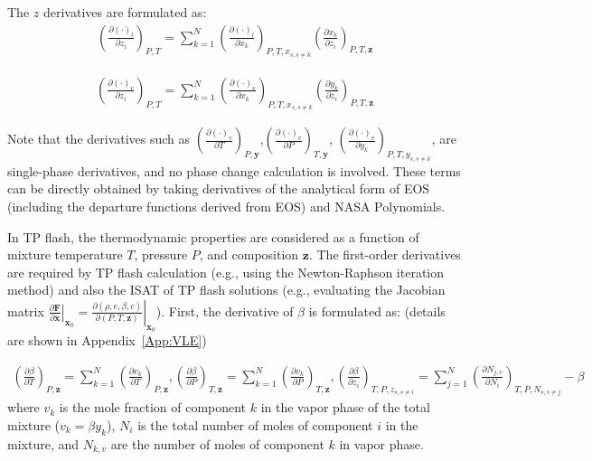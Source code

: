 The $z$ derivatives are formulated as:
\begin{align}
\left(\frac{\partial (\cdot)_l}{\partial z_i}\right)_{P,T} =  \sum_{k=1}^N\left(\frac{\partial (\cdot)_l}{\partial x_k}\right)_{P,T,x_{s,s\neq k}}\left(\frac{\partial x_k}{\partial z_i}\right)_{P,T,\mathbf{z}} \label{eq:dldz}
\end{align}

\begin{align}
\left(\frac{\partial (\cdot)_v}{\partial z_i}\right)_{P,T} =  \sum_{k=1}^N\left(\frac{\partial (\cdot)_v}{\partial x_k}\right)_{P,T,x_{s,s\neq k}}\left(\frac{\partial y_k}{\partial z_i}\right)_{P,T,\mathbf{z}} \label{eq:dvdz}
\end{align}

Note that the derivatives such as $\left(\frac{\partial (\cdot)_v}{\partial T}\right)_{P,\mathbf{y}}$,$\left(\frac{\partial (\cdot)_v}{\partial P}\right)_{T,\mathbf{y}}$, $\left(\frac{\partial (\cdot)_v}{\partial y_k}\right)_{P,T,y_{s,s\neq k}}$, are single-phase derivatives, and no phase change calculation is involved. These terms can be directly obtained by taking derivatives of the analytical form of EOS (including the departure functions derived from EOS) and NASA Polynomials. 


In TP flash, the thermodynamic properties are considered as a function of mixture temperature $T$, pressure $P$, and composition $\mathbf{z}$. The first-order derivatives are required by TP flash calculation (e.g., using the Newton-Raphson iteration method) and also the ISAT of TP flash solutions (e.g., evaluating the Jacobian matrix $\left.\frac{\partial  \mathbf{F}}{\partial \mathbf{x}}\right|_{\mathbf{x}_0} = \left.\frac{\partial  \left(\rho, e, \beta, c\right)}{\partial \left(P,T,\mathbf{z}\right)}\right|_{\mathbf{x}_0}$).
First, the derivative of $\beta$ is formulated as: (details are shown in Appendix~\ref{App:VLE})

\begin{align}
\left(\frac{\partial \beta }{\partial T}\right)_{P,\mathbf{z}} = \sum_{k=1}^N \left(\frac{\partial v_k}{\partial T}\right)_{P,\mathbf{z}},\left(\frac{\partial \beta}{\partial P}\right)_{T,\mathbf{z}} = \sum_{k=1}^N \left(\frac{\partial v_k}{\partial P}\right)_{T,\mathbf{z}}, \left(\frac{\partial \beta}{\partial z_i}\right)_{T,P,z_{s,s\neq i}}=\sum_{j=1}^N\left(\frac{\partial N_{j,v}}{\partial N_i}\right)_{T,P,N_{s,s\neq j}} -\beta
\end{align}
where $v_k$ is the mole fraction of component $k$ in the vapor phase of the total mixture ($v_k = \beta y_k$), 
$N_i$ is the total number of moles of component $i$ in the mixture, and $N_{k,v}$ are the number of moles of component $k$ in vapor phase.

